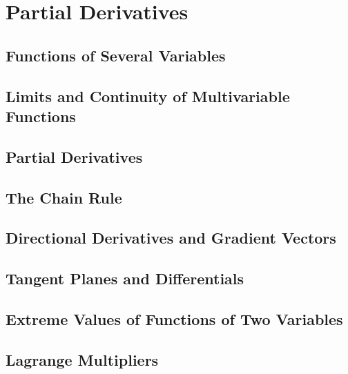 \section{Partial Derivatives}

\subsection{Functions of Several Variables}

\subsection{Limits and Continuity of Multivariable Functions}

\subsection{Partial Derivatives}

\subsection{The Chain Rule}

\subsection{Directional Derivatives and Gradient Vectors}

\subsection{Tangent Planes and Differentials}

\subsection{Extreme Values of Functions of Two Variables}

\subsection{Lagrange Multipliers}